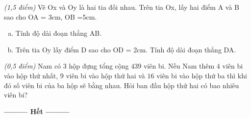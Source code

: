 \begin{ex}
\begin{enumerate}[a)]
\end{enumerate}
\end{ex}     \begin{ex}\textit{(1,5 điểm)} Vẽ Ox và Oy là hai tia đối nhau. Trên tia Ox, lấy hai điểm A và B sao cho OA = 3cm, OB =5cm.
\begin{enumerate}[a)]
\item Tính độ dài đoạn thẳng AB.
\item Trên tia Oy lấy điểm D sao cho OD = 2cm. Tính độ dài đoạn thẳng DA.
\end{enumerate}
\end{ex}     \begin{ex}\textit{(0,5 điểm)} 
Nam có $3$ hộp đựng tổng cộng $439$ viên bi. Nếu Nam thêm $4$ viên bi vào hộp thứ nhất, $9$ viên bi vào hộp thứ hai và $16$ viên bi vào hộp thứ ba thì khi đó số viên bi của ba hộp sẽ bằng nhau. Hỏi ban đầu hộp thứ hai có bao nhiêu viên bi?
\end{ex}
\begin{center}
\textbf{\textbf{---------} Hết \textbf{---------}}
\end{center}